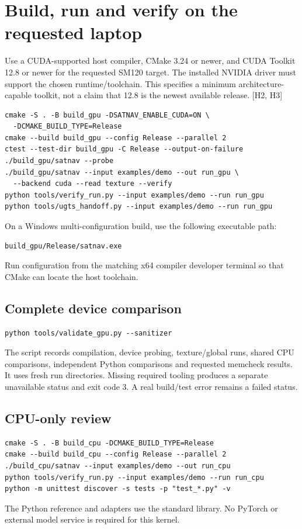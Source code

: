 \documentclass[11pt,a4paper]{article}
\newcommand{\ext}[1]{\textcolor{muted}{[#1]}}
\begin{document}
\section{Build, run and verify on the requested laptop}
Use a CUDA-supported host compiler, CMake 3.24 or newer, and CUDA Toolkit 12.8 or newer
for the requested SM120 target. The installed NVIDIA driver must support the chosen
runtime/toolchain. This specifies a minimum architecture-capable toolkit, not a claim
that 12.8 is the newest available release. \ext{H2, H3}

\begin{lstlisting}
cmake -S . -B build_gpu -DSATNAV_ENABLE_CUDA=ON \
  -DCMAKE_BUILD_TYPE=Release
cmake --build build_gpu --config Release --parallel 2
ctest --test-dir build_gpu -C Release --output-on-failure
./build_gpu/satnav --probe
./build_gpu/satnav --input examples/demo --out run_gpu \
  --backend cuda --read texture --verify
python tools/verify_run.py --input examples/demo --run run_gpu
python tools/ugts_handoff.py --input examples/demo --run run_gpu
\end{lstlisting}
On a Windows multi-configuration build, use the following executable path:
\begin{lstlisting}
build_gpu/Release/satnav.exe
\end{lstlisting}
Run configuration from the matching x64 compiler developer terminal so that CMake can locate the host toolchain.

\subsection{Complete device comparison}
\begin{lstlisting}
python tools/validate_gpu.py --sanitizer
\end{lstlisting}
The script records compilation, device probing, texture/global runs, shared CPU
comparisons, independent Python comparisons and requested memcheck results. It
uses fresh run directories. Missing required tooling produces a separate unavailable
status and exit code 3. A real build/test error remains a failed status.

\subsection{CPU-only review}
\begin{lstlisting}
cmake -S . -B build_cpu -DCMAKE_BUILD_TYPE=Release
cmake --build build_cpu --config Release --parallel 2
./build_cpu/satnav --input examples/demo --out run_cpu
python tools/verify_run.py --input examples/demo --run run_cpu
python -m unittest discover -s tests -p "test_*.py" -v
\end{lstlisting}
The Python reference and adapters use the standard library. No PyTorch or external
model service is required for this kernel.
\clearpage
\end{document}
